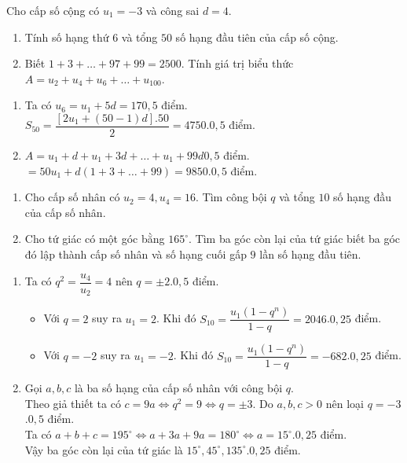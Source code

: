 \begin{bt}%
Cho cấp số cộng có $u_1=-3$ và công sai $d=4$.
\begin{enumerate}
\item Tính số hạng thứ $6$ và tổng $50$ số hạng đầu tiên của cấp số cộng.
\item Biết $1+3+\dots+97+99=2500$. Tính giá trị biểu thức $A=u_2+u_4+u_6+\dots +u_{100}$.
\end{enumerate}
\loigiai
{
\begin{enumerate}
\item Ta có $u_6=u_1+5d=17$\dotfill $0,5$ điểm.\\
$S_{50}=\dfrac{\left[2u_1+(50-1)d\right].50}{2}=4750$.\dotfill $0,5$ điểm.
\item $A=u_1+d+u_1+3d+ \dots + u_1+ 99d$\dotfill $0,5$ điểm.\\
$=50u_1+d(1+3+\dots +99)=9850$.\dotfill $0,5$ điểm.
\end{enumerate}
}
\end{bt}

\begin{bt}%
\begin{enumerate}
\item Cho cấp số nhân có $u_2=4, u_4=16$. Tìm công bội $q$ và tổng $10$ số hạng đầu của cấp số nhân.
\item Cho tứ giác có một góc bằng $165^\circ$. Tìm ba góc còn lại của tứ giác biết ba góc đó lập thành cấp số nhân và số hạng cuối gấp $9$ lần số hạng đầu tiên.

\end{enumerate}
\loigiai
{
\begin{enumerate}

\item Ta có $q^2=\dfrac{u_4}{u_2}=4$ nên $q=\pm 2$.\dotfill $0,5$ điểm.
\begin{itemize}
\item Với $q=2$ suy ra $u_1=2$. Khi đó $S_{10}=\dfrac{u_1\left(1-q^n\right)}{1-q}=2046$.\dotfill $0,25$ điểm.
\item Với $q=-2$ suy ra $u_1=-2$. Khi đó $S_{10}=\dfrac{u_1\left(1-q^n\right)}{1-q}=-682$.\dotfill $0,25$ điểm.
\end{itemize}
\item Gọi $a, b, c$ là ba số hạng của cấp số nhân với công bội $q$.\\
Theo giả thiết ta có $c=9a \Leftrightarrow q^2=9 \Leftrightarrow q= \pm 3$. Do $a, b, c >0$ nên loại $q=-3$.\dotfill $0,5$ điểm.\\
Ta có $a+b+c=195^\circ \Leftrightarrow a+3a+9a=180^\circ \Leftrightarrow a=15^\circ$.\dotfill $0,25$ điểm.\\
Vậy ba góc còn lại của tứ giác là $15^\circ, 45^\circ, 135^\circ$.\dotfill $0,25$ điểm.
\end{enumerate}
}
\end{bt}

